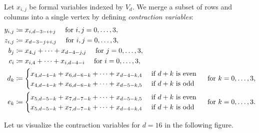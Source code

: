 \begin{definition}\label{def:contraction-variables}
Let \( x_{i,j} \) be formal variables indexed by \( V_d \). We merge a subset of rows and columns into a single vertex by defining \emph{contraction variables}:
\begin{align*}
    y_{i,j} &\coloneqq x_{i, d-3-i+j} \quad \text{ for } i,j = 0, \dots, 3, \\
    z_{i,j} &\coloneqq x_{d-3-j+i,j} \quad \text{ for } i,j = 0, \dots, 3, \\
    b_j &\coloneqq x_{4,j} + \dots + x_{d-4-j,j} \quad \text{ for } j = 0, \dots, 3, \\
    c_i &\coloneqq x_{i,4} + \dots + x_{i,d-4-i} \quad \text{ for } i = 0, \dots, 3, \\
    d_k &\coloneqq \begin{cases}
        x_{4,d-4-k} + x_{6,d-6-k} + \dots + x_{d-4-k,4} & \text{ if \( d + k \) is even} \\
        x_{4,d-4-k} + x_{6,d-6-k} + \dots + x_{d-5-k,5} & \text{ if \( d + k \) is odd}
    \end{cases} \quad \text{ for } k = 0, \dots, 3, \\
    e_k &\coloneqq \begin{cases}
        x_{5,d-5-k} + x_{7,d-7-k} + \dots + x_{d-5-k,5} & \text{ if \( d + k \) is even} \\
        x_{5,d-5-k} + x_{7,d-7-k} + \dots + x_{d-4-k,4} & \text{ if \( d + k \) is odd}
    \end{cases} \quad \text{ for } k = 0, \dots, 3.
\end{align*}
\end{definition}

Let us visualize the contraction variables for \( d = 16 \) in the following figure.

